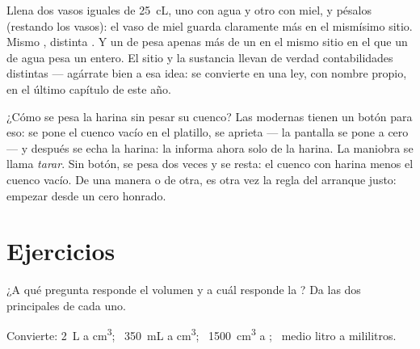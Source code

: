 \begin{example}\label{ex:g6:mass-and-volume:different}
Llena dos vasos iguales de \qty{25}{cL}, uno con agua y otro con miel,
y pésalos (restando los vasos): el vaso de miel guarda claramente más
 en el mismísimo sitio. Mismo , distinta . Y un
 de  pesa apenas más de un  en el mismo sitio en
el que un  de agua pesa un  entero. El sitio y la
sustancia llevan de verdad contabilidades distintas --- agárrate bien
a esa idea: se convierte en una ley, con nombre propio, en el último
capítulo de este año.
\end{example}

\begin{remark}\label{rem:g6:mass-and-volume:tare}
¿Cómo se pesa la harina sin pesar su cuenco? Las  modernas
tienen un botón para eso: se pone el cuenco vacío en el platillo, se
aprieta --- la pantalla se pone a cero --- y después se echa la
harina: la  informa ahora solo de la harina. La maniobra se
llama \emph{tarar}. Sin botón, se pesa dos veces y se resta: el cuenco
con harina menos el cuenco vacío. De una manera o de otra, es otra vez
la regla del arranque justo: empezar desde un cero honrado.
\end{remark}

\section{Ejercicios}

\begin{exercise}[$\star$]\label{exo:g6:mass-and-volume:1}
¿A qué pregunta responde el volumen y a cuál responde la ? Da
las dos  principales de cada uno.
\end{exercise}

\begin{exercise}[$\star$]\label{exo:g6:mass-and-volume:2}
Convierte: \qty{2}{L} a \unit{cm^3}; \ \qty{350}{mL} a \unit{cm^3}; \
\qty{1500}{cm^3} a ; \ medio litro a mililitros.
\end{exercise}

